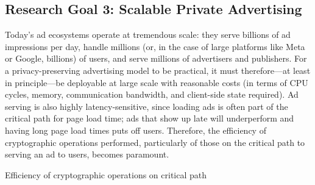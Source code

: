 \subsection{Research Goal 3: Scalable Private Advertising}
\label{s:rg3}

%
Today's ad ecosystems operate at tremendous scale: they serve billions of ad impressions per day, handle millions (or, in the case of large platforms like Meta or Google, billions) of users, and serve millions of advertisers and publishers.
%
For a privacy-preserving advertising model to be practical, it must therefore---at least in principle---be deployable at large scale with reasonable costs (in terms of CPU cycles, memory, communication bandwidth, and client-side state required).
%
Ad serving is also highly latency-sensitive, since loading ads is often part of the critical path for page load time; ads that show up late will underperform and having long page load times puts off users.
%
Therefore, the efficiency of cryptographic operations performed, particularly of those on the critical path to serving an ad to users, becomes paramount.
%

Efficiency of cryptographic operations on critical path

